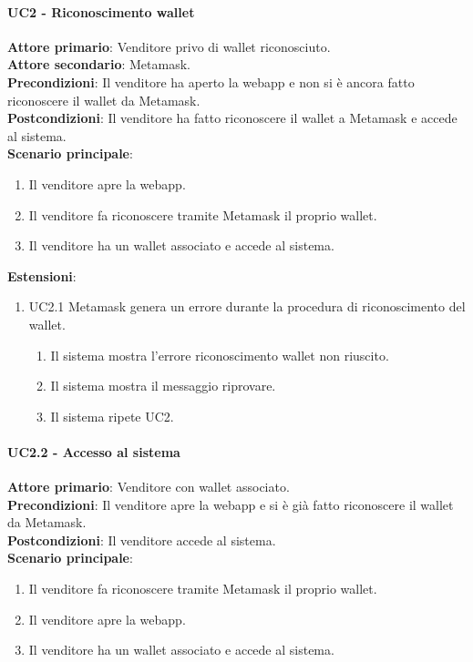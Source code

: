 \documentclass[a4paper, 12pt]{article}
\begin{document}
\paragraph{UC2 - Riconoscimento wallet}
\textbf{Attore primario}: Venditore privo di wallet riconosciuto.\\
\textbf{Attore secondario}: Metamask.\\
\textbf{Precondizioni}: Il venditore ha aperto la webapp e non si è ancora fatto riconoscere il wallet da Metamask.\\
\textbf{Postcondizioni}: Il venditore ha fatto riconoscere il wallet a Metamask e accede al sistema.\\
\textbf{Scenario principale}:
\begin{enumerate}
    \item Il venditore apre la webapp.
    \item Il venditore fa riconoscere tramite Metamask il proprio wallet.
    \item Il venditore ha un wallet associato e accede al sistema.
\end{enumerate}
\textbf{Estensioni}:
\begin{enumerate}
    \item UC2.1 Metamask genera un errore durante la procedura di riconoscimento del wallet.
    \begin{enumerate}
        \item Il sistema mostra l'errore riconoscimento wallet non riuscito.
        \item Il sistema mostra il messaggio riprovare.
        \item Il sistema ripete UC2.
    \end{enumerate}
\end{enumerate}

\paragraph{UC2.2 - Accesso al sistema}
\textbf{Attore primario}: Venditore con wallet associato.\\
\textbf{Precondizioni}: Il venditore apre la webapp e si è già fatto riconoscere il wallet da Metamask.\\
\textbf{Postcondizioni}: Il venditore accede al sistema.\\
\textbf{Scenario principale}:
\begin{enumerate}
    \item Il venditore fa riconoscere tramite Metamask il proprio wallet.
    \item Il venditore apre la webapp.
    \item Il venditore ha un wallet associato e accede al sistema.
\end{enumerate}
\end{document}

